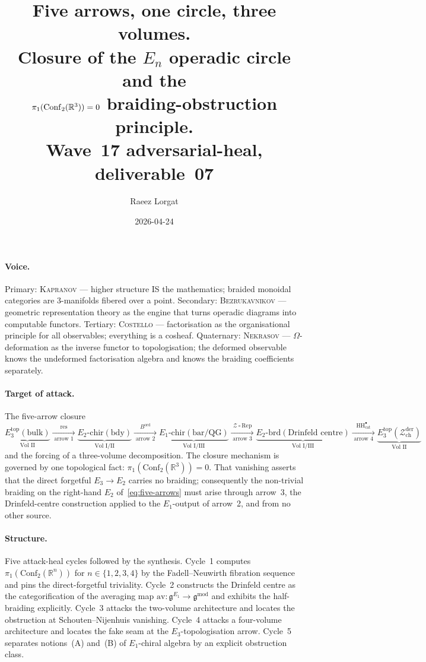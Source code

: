 \documentclass[11pt]{article}
\title{Five arrows, one circle, three volumes.\\
Closure of the $E_n$ operadic circle and the\\
$\pi_1(\Conf_2(\bR^3)) = 0$ braiding-obstruction principle.\\
Wave~17 adversarial-heal, deliverable~07}
\author{Raeez Lorgat}
\date{2026-04-24}
\theoremstyle{definition}
\theoremstyle{remark}
\newcommand{\bR}{\mathbb{R}}
\newcommand{\cZ}{\mathcal{Z}}
\newcommand{\fg}{\mathfrak{g}}
\newcommand{\Conf}{\mathrm{Conf}}
\newcommand{\Rep}{\mathrm{Rep}}
\newcommand{\HH}{\mathrm{HH}}
\newcommand{\Zder}{\cZ^{\mathrm{der}}_{\mathrm{ch}}}
\newcommand{\Eone}{E_1}
\newcommand{\Etwo}{E_2}
\newcommand{\Ethree}{E_3}
\newcommand{\ord}{\mathrm{ord}}
\newcommand{\av}{\mathrm{av}}
\DeclareMathOperator{\res}{res}
\begin{document}
\maketitle

\paragraph{Voice.}
Primary: \textsc{Kapranov} --- higher structure IS the mathematics;
braided monoidal categories are $3$-manifolds fibered over a point.
Secondary: \textsc{Bezrukavnikov} --- geometric representation theory
as the engine that turns operadic diagrams into computable
functors. Tertiary: \textsc{Costello} --- factorisation as the
organisational principle for all observables; everything is a
cosheaf. Quaternary: \textsc{Nekrasov} --- $\Omega$-deformation as
the inverse functor to topologisation; the deformed observable
knows the undeformed factorisation algebra and knows the braiding
coefficients separately.

\paragraph{Target of attack.}
The five-arrow closure
\begin{equation}
\label{eq:five-arrows}
\underbrace{\Ethree^{\mathrm{top}}(\text{bulk})}_{\text{Vol~II}}
\xrightarrow[\;\text{arrow~1}\;]{\res}
\underbrace{\Etwo\text{-chir}(\text{bdy})}_{\text{Vol~I/II}}
\xrightarrow[\;\text{arrow~2}\;]{B^{\ord}}
\underbrace{\Eone\text{-chir}(\text{bar/QG})}_{\text{Vol~I/III}}
\xrightarrow[\;\text{arrow~3}\;]{\cZ\circ\Rep}
\underbrace{\Etwo\text{-brd}(\text{Drinfeld centre})}_{\text{Vol~I/III}}
\xrightarrow[\;\text{arrow~4}\;]{\HH^\bullet_{\mathrm{cat}}}
\underbrace{\Ethree^{\mathrm{top}}(\Zder)}_{\text{Vol~II}}
\end{equation}
and the forcing of a three-volume decomposition. The closure
mechanism is governed by one topological fact:
$\pi_1(\Conf_2(\bR^3)) = 0$. That vanishing asserts that the
direct forgetful $\Ethree \to \Etwo$ carries no braiding;
consequently the non-trivial braiding on the right-hand $\Etwo$
of~\eqref{eq:five-arrows} must arise through arrow~3, the
Drinfeld-centre construction applied to the $\Eone$-output of
arrow~2, and from no other source.

\paragraph{Structure.}
Five attack-heal cycles followed by the synthesis.
Cycle~1 computes $\pi_1(\Conf_2(\bR^n))$ for $n \in \{1,2,3,4\}$
by the Fadell--Neuwirth fibration sequence and pins the
direct-forgetful triviality. Cycle~2 constructs the Drinfeld
centre as the categorification of the averaging map
$\av\colon \fg^{\Eone} \to \fg^{\mathrm{mod}}$ and exhibits the
half-braiding explicitly. Cycle~3 attacks the two-volume
architecture and locates the obstruction at Schouten--Nijenhuis
vanishing. Cycle~4 attacks a four-volume architecture and
locates the fake seam at the $\Ethree$-topologisation arrow.
Cycle~5 separates notions~(A) and~(B) of $\Eone$-chiral algebra
by an explicit obstruction class.
\end{document}
